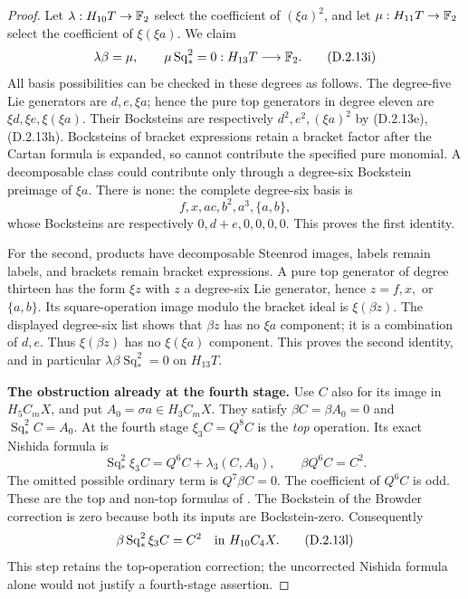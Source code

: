 \begin{proof}
Let $\lambda:H_{10}T\to\mathbb F_2$ select the coefficient of
$(\xi a)^2$, and let $\mu:H_{11}T\to\mathbb F_2$ select the coefficient
of $\xi(\xi a)$. We claim
\[
 \lambda\beta=\mu,\qquad
 \mu\operatorname{Sq}_*^2=0:H_{13}T\longrightarrow\mathbb F_2.
 \tag{D.2.13i}
\]
All basis possibilities can be checked in these degrees as follows.
The degree-five Lie generators are $d,e,\xi a$; hence the pure
top generators in degree eleven are $\xi d,\xi e,\xi(\xi a)$.
Their Bocksteins are respectively $d^2,e^2,(\xi a)^2$ by
\textup{(D.2.13e),(D.2.13h)}. Bocksteins of bracket expressions
retain a bracket factor after the Cartan formula is expanded, so
cannot contribute the specified pure monomial. A decomposable
class could contribute only through a degree-six Bockstein
preimage of $\xi a$. There is none: the complete degree-six
basis is
\[
 f, x, ac, b^2, a^3, \{a,b\},
 \tag{D.2.13j}
\]
whose Bocksteins are respectively $0,d+e,0,0,0,0$.
This proves the first identity.

For the second, products have decomposable Steenrod images,
labels remain labels, and brackets remain bracket expressions.
A pure top generator of degree thirteen has the form $\xi z$
with $z$ a degree-six Lie generator, hence $z=f,x,$ or $\{a,b\}$.
Its square-operation image modulo the bracket ideal is
$\xi(\beta z)$. The displayed degree-six list shows that
$\beta z$ has no $\xi a$ component; it is a combination of
$d,e$. Thus $\xi(\beta z)$ has no $\xi(\xi a)$ component.
This proves the second identity, and in particular
$\lambda\beta\operatorname{Sq}_*^2=0$ on $H_{13}T$.

\medskip\noindent
\textbf{The obstruction already at the fourth stage.}
Use $C$ also for its image in $H_5C_mX$, and put
$A_0=\sigma a\in H_3C_mX$. They satisfy
$\beta C=\beta A_0=0$ and $\operatorname{Sq}_*^2C=A_0$.
At the fourth stage $\xi_3C=Q^8C$ is the \emph{top} operation.
Its exact Nishida formula is
\[
 \operatorname{Sq}_*^2\xi_3C
       =Q^6C+\lambda_3(C,A_0),\qquad
 \beta Q^6C=C^2.
 \tag{D.2.13k}
\]
The omitted possible ordinary term is $Q^7\beta C=0$.
The coefficient of $Q^6C$ is odd. These are the top and non-top
formulas of \cite[Chapter III, Theorems~1.1--1.3,
especially pp.~217--218]{I_CohenLadaMay1976}.
The Bockstein of the Browder correction is zero because both
its inputs are Bockstein-zero. Consequently
\[
 \beta\operatorname{Sq}_*^2\xi_3C=C^2
       \quad\hbox{in }H_{10}C_4X.
 \tag{D.2.13l}
\]
This step retains the top-operation correction; the uncorrected
Nishida formula alone would not justify a fourth-stage assertion.


\end{proof}
